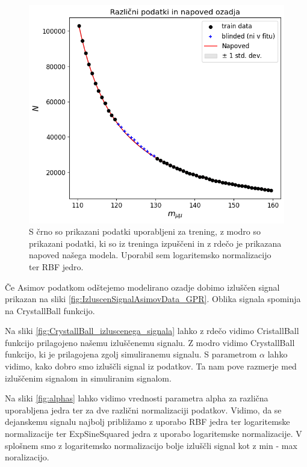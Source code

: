\documentclass[slovene,11pt,a4paper]{article}
\begin{document}
\begin{figure}[h!]
    \centering
    \includegraphics[width=0.8\linewidth]{imgs/RazlicniPodatki_2.png}
    \caption{S črno so prikazani podatki uporabljeni za trening, z modro so prikazani podatki, ki so iz treninga izpuščeni in z rdečo je prikazana napoved našega modela. Uporabil sem logaritemsko normalizacijo ter RBF jedro.}
    \label{fig:RazlicniPodatki_2}
\end{figure}

Če Asimov podatkom odštejemo modelirano ozadje dobimo izluščen signal prikazan na sliki \ref{fig:IzluscenSignalAsimovData_GPR}. Oblika signala spominja na CrystallBall funkcijo.

Na sliki \ref{fig:CrystallBall_izluscenega_signala} lahko z rdečo vidimo CristallBall funkcijo prilagojeno našemu izluščenemu signalu. Z modro vidimo CrystallBall funkcijo, ki je prilagojena zgolj simuliranemu signalu. S parametrom $\alpha$ lahko vidimo, kako dobro smo izluščli signal iz podatkov. Ta nam pove razmerje med izluščenim signalom in simuliranim signalom.

Na sliki \ref{fig:alphas} lahko vidimo vrednosti parametra alpha za različna uporabljena jedra ter za dve različni normalizaciji podatkov. Vidimo, da se dejanskemu signalu najbolj približamo z uporabo RBF jedra ter logaritemske normalizacije ter ExpSineSquared jedra z uporabo logaritemske normalizacije. V splošnem smo z logaritemsko normalizacijo bolje izluščli signal kot z min - max noralizacijo.
\end{document}
